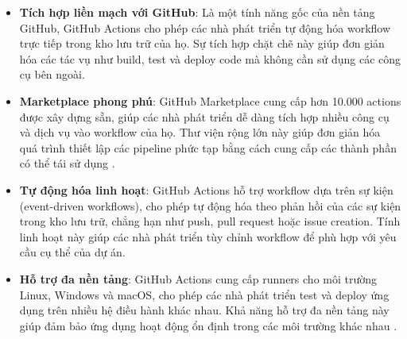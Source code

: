 \begin{enumerate}[(a)]
        \begin{itemize}
            \item \textbf{Tích hợp liền mạch với GitHub}: Là một tính năng gốc của nền tảng GitHub, GitHub Actions cho phép các nhà phát triển tự động hóa workflow trực tiếp trong kho lưu trữ của họ. Sự tích hợp chặt chẽ này giúp đơn giản hóa các tác vụ như build, test và deploy code mà không cần sử dụng các công cụ bên ngoài.
            \item \textbf{Marketplace phong phú}: GitHub Marketplace cung cấp hơn 10.000 actions được xây dựng sẵn, giúp các nhà phát triển dễ dàng tích hợp nhiều công cụ và dịch vụ vào workflow của họ. Thư viện rộng lớn này giúp đơn giản hóa quá trình thiết lập các pipeline phức tạp bằng cách cung cấp các thành phần có thể tái sử dụng \cite{GitHubActionsIntro}.
            \item \textbf{Tự động hóa linh hoạt}: GitHub Actions hỗ trợ workflow dựa trên sự kiện (event-driven workflows), cho phép tự động hóa theo phản hồi của các sự kiện trong kho lưu trữ, chẳng hạn như push, pull request hoặc issue creation. Tính linh hoạt này giúp các nhà phát triển tùy chỉnh workflow để phù hợp với yêu cầu cụ thể của dự án.
            \item \textbf{Hỗ trợ đa nền tảng}: GitHub Actions cung cấp runners cho môi trường Linux, Windows và macOS, cho phép các nhà phát triển test và deploy ứng dụng trên nhiều hệ điều hành khác nhau. Khả năng hỗ trợ đa nền tảng này giúp đảm bảo ứng dụng hoạt động ổn định trong các môi trường khác nhau \cite{GitHubActionsDocs}.
        \end{itemize}
        


\end{enumerate}
